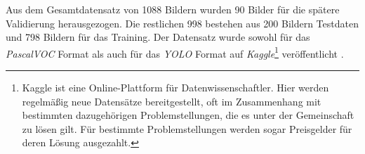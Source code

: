 Aus dem Gesamtdatensatz von 1088 Bildern wurden 90 Bilder für die spätere Validierung herausgezogen. Die restlichen 998 bestehen aus 200 Bildern Testdaten und 798 Bildern für das Training. Der Datensatz wurde sowohl für das \textit{PascalVOC} Format als auch für das \textit{YOLO} Format auf \textit{Kaggle}\footnote{Kaggle ist eine Online-Plattform für Datenwissenschaftler. Hier werden regelmäßig neue Datensätze bereitgestellt, oft im Zusammenhang mit bestimmten dazugehörigen Problemstellungen, die es unter der Gemeinschaft zu lösen gilt. Für bestimmte Problemstellungen werden sogar Preisgelder für deren Lösung ausgezahlt.} veröffentlicht \cite{FelixHausberger.20200503}.
